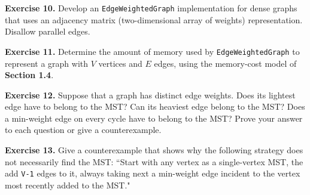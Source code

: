 \documentclass[12pt, a4paper]{article}
\newenvironment{ex}[2][Exercise]
{\par\medskip\noindent \textbf{#1 #2.}}
{\medskip}
\begin{document}
	\begin{ex}{10}
		Develop an \texttt{EdgeWeightedGraph} implementation for dense graphs that uses an
		adjacency matrix (two-dimensional array of weights) representation. Disallow parallel
		edges.
	\end{ex}
	\begin{ex}{11}
		Determine the amount of memory used by \texttt{EdgeWeightedGraph} to represent a graph
		with $V$ vertices and $E$ edges, using the memory-cost model of \textbf{Section 1.4}.
	\end{ex}
	\begin{ex}{12}
		Suppose that a graph has distinct edge weights. Does its lightest edge have to belong
		to the MST? Can its heaviest edge belong to the MST? Does a min-weight edge on
		every cycle have to belong to the MST? Prove your answer to each question or give
		a counterexample.
	\end{ex}
	\begin{ex}{13}
		Give a counterexample that shows why the following strategy does not necessarily
		find the MST: ``Start with any vertex as a single-vertex MST, the add \texttt{V-1}
		edges to it, always taking next a min-weight edge incident to the vertex most
		recently added to the MST."
	\end{ex}
	
	\pagebreak
	\printbibliography
\end{document}
